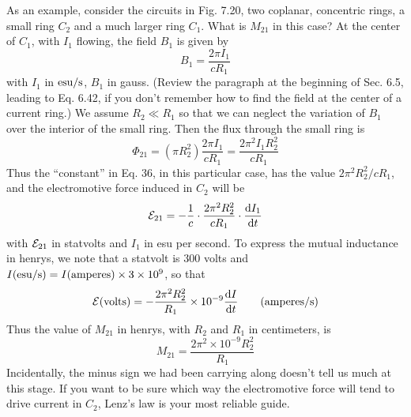 As an example, consider the circuits in Fig. 7.20, two coplanar,
concentric rings, a small ring $C_2$ and a much larger ring $C_1$. What
is $M_{21}$ in this case? At the center of $C_1$, with $I_1$ flowing, the field $B_1$
is given by
\begin{equation}
  B_1 = \frac{2\pi I_1}{c R_1}
\end{equation}
with $I_1$ in $\textup{esu}/\textup{s}$, $B_1$ in gauss. (Review the paragraph at the beginning
of Sec. 6.5, leading to Eq. 6.42, if you don't remember how to
find the field at the center of a current ring.) We assume $R_2 \ll R_1$
so that we can neglect the variation of $B_1$ over the interior of the small
ring. Then the flux through the small ring is
\begin{equation}
  \Phi_{21} = (\pi R_2^2)\frac{2\pi I_1}{c R_1} = \frac{2\pi^2 I_1 R_2^2}{c R_1}
\end{equation}
Thus the ``constant'' in Eq. 36, in this particular case, has the value
$2\pi^2R_2^2/cR_1$, and the electromotive force induced in $C_2$ will be
\begin{equation}
  \mathcal{E}_{21} = -\frac{1}{c}\cdot\frac{2\pi^2 R_2^2}{c R_1}\cdot \frac{\textup{d} I_1}{\textup{d} t}
\end{equation}
with $\mathcal{E}_{21}$ in statvolts and $I_1$ in esu per second. To express the mutual
inductance in henrys, we note that a statvolt is 300 volts and
$I(\textup{esu}/\textup{s}) = I(\text{amperes}) \times 3 \times 10^9$, so that
\begin{equation}
  \mathcal{E} (\text{volts}) = - \frac{2\pi^2 R_2^2}{ R_1} \times 10^{-9} \frac{\textup{d} I}{\textup{d} t}\qquad(\text{amperes/s})
\end{equation}
Thus the value of $M_{21}$ in henrys, with $R_2$ and $R_1$ in centimeters, is
\begin{equation}
  M_{21} = \frac{2\pi^2 \times 10^{-9}R_2^2}{R_1}
\end{equation}
Incidentally, the minus sign we had been carrying along doesn't tell
us much at this stage. If you want to be sure which way the electromotive
force will tend to drive current in $C_2$, Lenz's law is your most
reliable guide.

